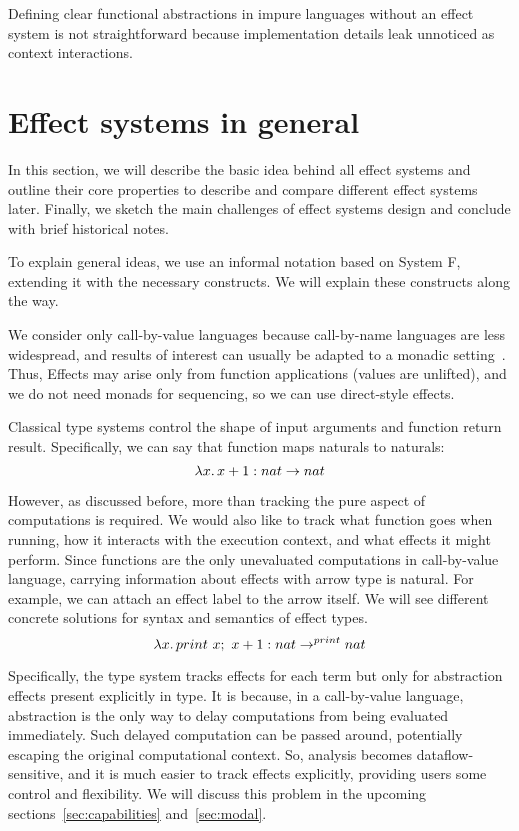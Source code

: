 \documentclass[conference]{IEEEtran}
\newcommand{\seq}{;~}
\newcommand{\ap}{~}
\begin{document}
    Defining clear functional abstractions in impure languages without an effect system is not straightforward because implementation details leak unnoticed as context interactions.


    \section{Effect systems in general}

    In this section, we will describe the basic idea behind all effect systems and outline their core properties to describe and compare different effect systems later.
    Finally, we sketch the main challenges of effect systems design and conclude with brief historical notes.

    To explain general ideas, we use an informal notation based on System F, extending it with the necessary constructs.
    We will explain these constructs along the way.

    We consider only call-by-value languages because call-by-name languages are less widespread, and results of interest can usually be adapted to a monadic setting~\cite{wadler2003marriage}.
    Thus, Effects may arise only from function applications (values are unlifted), and we do not need monads for sequencing, so we can use direct-style effects.


    Classical type systems control the shape of input arguments and function return result.
    Specifically, we can say that function maps naturals to naturals:
    \[\lambda x\ldotp x + 1 : nat\to nat\]

    However, as discussed before, more than tracking the pure aspect of computations is required.
    We would also like to track what function goes when running, how it interacts with the execution context, and what effects it might perform.
    Since functions are the only unevaluated computations in call-by-value language, carrying information about effects with arrow type is natural.
    For example, we can attach an effect label to the arrow itself.
    We will see different concrete solutions for syntax and semantics of effect types.
    \[\lambda x\ldotp print \ap x\seq x + 1 : nat\to^{print} nat\]

    Specifically, the type system tracks effects for each term but only for abstraction effects present explicitly in type.
    It is because, in a call-by-value language, abstraction is the only way to delay computations from being evaluated immediately.
    Such delayed computation can be passed around, potentially escaping the original computational context.
    So, analysis becomes dataflow-sensitive, and it is much easier to track effects explicitly, providing users some control and flexibility.
    We will discuss this problem in the upcoming sections~\ref{sec:capabilities} and~\ref{sec:modal}.
\end{document}

